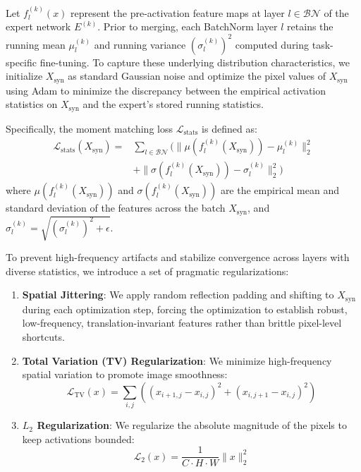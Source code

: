 \documentclass{article}
\theoremstyle{plain}
\theoremstyle{definition}
\theoremstyle{remark}
\begin{document}
Let $f_l^{(k)}(x)$ represent the pre-activation feature maps at layer $l \in \mathcal{BN}$ of the expert network $E^{(k)}$. Prior to merging, each BatchNorm layer $l$ retains the running mean $\mu_l^{(k)}$ and running variance $(\sigma_l^{(k)})^2$ computed during task-specific fine-tuning. To capture these underlying distribution characteristics, we initialize $X_{\text{syn}}$ as standard Gaussian noise and optimize the pixel values of $X_{\text{syn}}$ using Adam to minimize the discrepancy between the empirical activation statistics on $X_{\text{syn}}$ and the expert's stored running statistics.

Specifically, the moment matching loss $\mathcal{L}_{\text{stats}}$ is defined as:
\begin{equation}
\begin{aligned}
  \mathcal{L}_{\text{stats}}(X_{\text{syn}}) = &\sum_{l \in \mathcal{BN}} \Big( \| \mu(f_l^{(k)}(X_{\text{syn}})) - \mu_l^{(k)} \|_2^2 \\
  &+ \| \sigma(f_l^{(k)}(X_{\text{syn}})) - \sigma_l^{(k)} \|_2^2 \Big)
\end{aligned}
\end{equation}
where $\mu(f_l^{(k)}(X_{\text{syn}}))$ and $\sigma(f_l^{(k)}(X_{\text{syn}}))$ are the empirical mean and standard deviation of the features across the batch $X_{\text{syn}}$, and $\sigma_l^{(k)} = \sqrt{(\sigma_l^{(k)})^2 + \epsilon}$.

To prevent high-frequency artifacts and stabilize convergence across layers with diverse statistics, we introduce a set of pragmatic regularizations:
\begin{enumerate}
  \item \textbf{Spatial Jittering}: We apply random reflection padding and shifting to $X_{\text{syn}}$ during each optimization step, forcing the optimization to establish robust, low-frequency, translation-invariant features rather than brittle pixel-level shortcuts.
  \item \textbf{Total Variation (TV) Regularization}: We minimize high-frequency spatial variation to promote image smoothness:
  \begin{equation}
    \mathcal{L}_{\text{TV}}(x) = \sum_{i,j} \left( (x_{i+1,j} - x_{i,j})^2 + (x_{i,j+1} - x_{i,j})^2 \right)
  \end{equation}
  \item \textbf{$L_2$ Regularization}: We regularize the absolute magnitude of the pixels to keep activations bounded:
  \begin{equation}
    \mathcal{L}_{2}(x) = \frac{1}{C \cdot H \cdot W} \| x \|_2^2
  \end{equation}
\end{enumerate}
\end{document}
